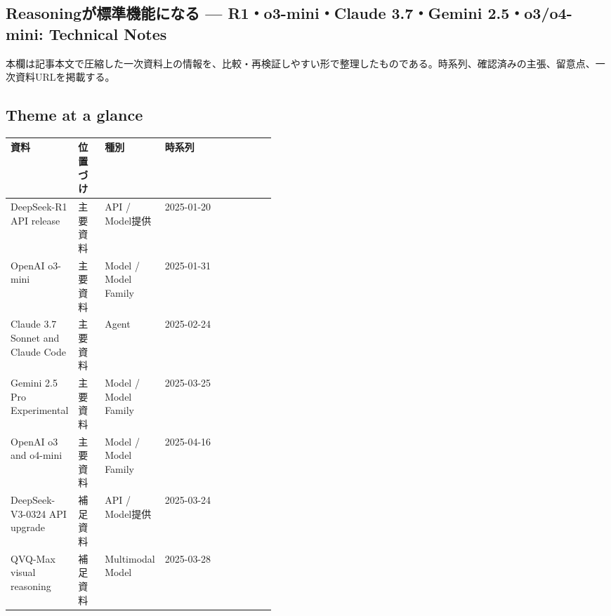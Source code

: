 \subsection*{Reasoningが標準機能になる — R1・o3-mini・Claude 3.7・Gemini 2.5・o3/o4-mini: Technical Notes}
本欄は記事本文で圧縮した一次資料上の情報を、比較・再検証しやすい形で整理したものである。時系列、確認済みの主張、留意点、一次資料URLを掲載する。
\medskip
\subsection*{Theme at a glance}
\begin{center}
\footnotesize
\begin{tabularx}{\linewidth}{@{}p{0.20\linewidth}p{0.10\linewidth}p{0.14\linewidth}X@{}}
\toprule
資料 & 位置づけ & 種別 & 時系列 \\
\midrule
DeepSeek-R1 API release & 主要資料 & API / Model提供 & 2025-01-20   \\
OpenAI o3-mini & 主要資料 & Model / Model Family & 2025-01-31   \\
Claude 3.7 Sonnet and Claude Code & 主要資料 & Agent & 2025-02-24   \\
Gemini 2.5 Pro Experimental & 主要資料 & Model / Model Family & 2025-03-25   \\
OpenAI o3 and o4-mini & 主要資料 & Model / Model Family & 2025-04-16   \\
DeepSeek-V3-0324 API upgrade & 補足資料 & API / Model提供 & 2025-03-24   \\
QVQ-Max visual reasoning & 補足資料 & Multimodal Model & 2025-03-28   \\
\bottomrule
\end{tabularx}
\end{center}
\normalsize

